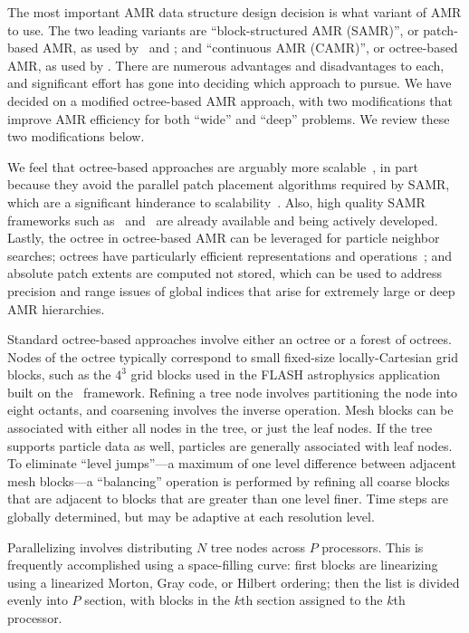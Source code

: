 \documentclass[10pt,twocolumn]{article}
\begin{document}
The most important AMR data structure design decision is what variant
of AMR to use.  The two leading variants are ``block-structured AMR
(SAMR)'', or patch-based AMR, as used by \samrai\ and \chombo; and
``continuous AMR (CAMR)'', or octree-based AMR, as used by \paramesh.
There are numerous advantages and disadvantages to each, and
significant effort has gone into deciding which approach to pursue.
We have decided on a modified octree-based AMR approach, with two
modifications that improve AMR efficiency for both ``wide'' and
``deep'' problems.  We review these two modifications below.

We feel that octree-based approaches are arguably more
scalable~\cite{BuGh08}, in part because they avoid the parallel patch
placement algorithms required by SAMR, which are a significant
hinderance to scalability~\cite{GuWi06}.  Also, high quality SAMR
frameworks such as \chombo\ and \samrai\ are already available and
being actively developed.  Lastly, the octree in octree-based AMR can
be leveraged for particle neighbor searches; octrees have particularly
efficient representations and operations~\cite{FrPe02}; and absolute patch
extents are computed not stored, which can be used to address
precision and range issues of global indices that arise for extremely
large or deep AMR hierarchies.

Standard octree-based approaches involve either an octree or a forest
of octrees.  Nodes of the octree typically correspond to small
fixed-size locally-Cartesian grid blocks, such as the $4^3$ grid
blocks used in the FLASH astrophysics application built on the
\paramesh\ framework.  Refining a tree node involves partitioning the
node into eight octants, and coarsening involves the inverse
operation.  Mesh blocks can be associated with either all nodes in the
tree, or just the leaf nodes.  If the tree supports particle data as
well, particles are generally associated with leaf nodes.  To
eliminate ``level jumps''---a maximum of one level difference between
adjacent mesh blocks---a ``balancing'' operation is performed by
refining all coarse blocks that are adjacent to blocks that are
greater than one level finer.  Time steps are globally determined,
but may be adaptive at each resolution level.

Parallelizing involves distributing $N$ tree nodes across $P$
processors.  This is frequently accomplished using a space-filling
curve: first blocks are linearizing using a linearized Morton, Gray
code, or Hilbert ordering; then the list is divided evenly into $P$
section, with blocks in the $k$th section assigned to the $k$th
processor.
\end{document}
